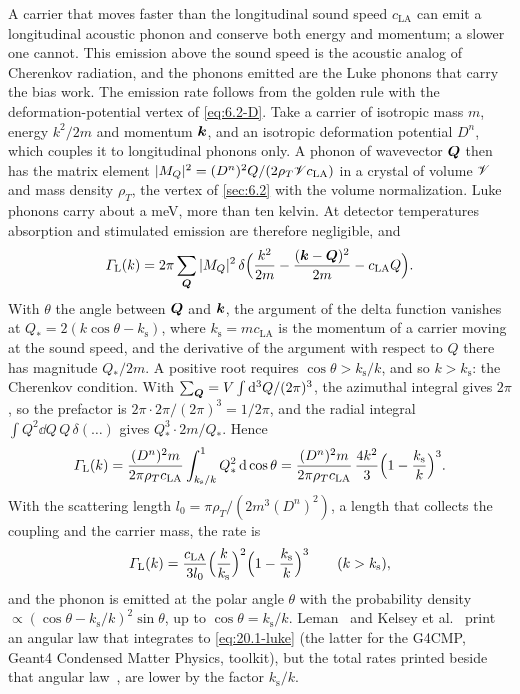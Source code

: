 A carrier that moves faster than the longitudinal sound speed $c_{\mathrm{LA}}$ can emit a longitudinal acoustic phonon and conserve both energy and momentum; a slower one cannot. This emission above the sound speed is the acoustic analog of Cherenkov radiation, and the phonons emitted are the Luke phonons that carry the bias work. The emission rate follows from the golden rule with the deformation-potential vertex of \cref{eq:6.2-D}. Take a carrier of isotropic mass $m$, energy $k^2/2m$ and momentum $\bm{k}$, and an isotropic deformation potential $D^n$, which couples it to longitudinal phonons only. A phonon of wavevector $\bm{Q}$ then has the matrix element $|M_Q|^2 = (D^n)^2Q/(2\rho_T\mathscr{V} c_{\mathrm{LA}})$ in a crystal of volume $\mathscr{V}$ and mass density $\rho_T$, the vertex of \cref{sec:6.2} with the volume normalization. Luke phonons carry about a meV, more than ten kelvin. At detector temperatures absorption and stimulated emission are therefore negligible, and
\begin{equation*}
  \varGamma_{\mathrm{L}}(k) = 2\pi\sum_{\bm{Q}}|M_Q|^2\,\delta\Bigl(\frac{k^2}{2m} - \frac{(\bm{k} - \bm{Q})^2}{2m} - c_{\mathrm{LA}}Q\Bigr) .
\end{equation*}
With $\theta$ the angle between $\bm{Q}$ and $\bm{k}$, the argument of the delta function vanishes at $Q_* = 2(k\cos\theta - k_{\mathrm{s}})$, where $k_{\mathrm{s}} = mc_{\mathrm{LA}}$ is the momentum of a carrier moving at the sound speed, and the derivative of the argument with respect to $Q$ there has magnitude $Q_*/2m$. A positive root requires $\cos\theta > k_{\mathrm{s}}/k$, and so $k > k_{\mathrm{s}}$: the Cherenkov condition. With $\sum_{\bm{Q}} = V\int\mathrm{d}^3Q/(2\pi)^3$, the azimuthal integral gives $2\pi$, so the prefactor is $2\pi\cdot2\pi/(2\pi)^3 = 1/2\pi$, and the radial integral $\int Q^2\dd Q\,Q\,\delta(\ldots)$ gives $Q_*^3\cdot2m/Q_*$. Hence
\begin{equation*}
  \varGamma_{\mathrm{L}}(k) = \frac{(D^n)^2m}{2\pi\rho_Tc_{\mathrm{LA}}}\int_{k_{\mathrm{s}}/k}^1 Q_*^2\,\mathrm{d}\cos\theta = \frac{(D^n)^2m}{2\pi\rho_Tc_{\mathrm{LA}}}\,\frac{4k^2}{3}\Bigl(1 - \frac{k_{\mathrm{s}}}{k}\Bigr)^3 .
\end{equation*}
With the scattering length $l_0 = \pi\rho_T/(2m^3(D^n)^2)$, a length that collects the coupling and the carrier mass, the rate is
\begin{equation}
  \varGamma_{\mathrm{L}}(k) = \frac{c_{\mathrm{LA}}}{3l_0}\Bigl(\frac{k}{k_{\mathrm{s}}}\Bigr)^2\Bigl(1 - \frac{k_{\mathrm{s}}}{k}\Bigr)^3 \qquad (k > k_{\mathrm{s}}),
  \label{eq:20.1-luke}
\end{equation}
and the phonon is emitted at the polar angle $\theta$ with the probability density $\propto(\cos\theta - k_{\mathrm{s}}/k)^2\sin\theta$, up to $\cos\theta = k_{\mathrm{s}}/k$. Leman~\cite[Eq.~(22)]{leman2012invited} and Kelsey et al.~\cite[Eq.~(9)]{kelsey2023g4cmp} print an angular law that integrates to \cref{eq:20.1-luke} (the latter for the G4CMP, Geant4 Condensed Matter Physics, toolkit), but the total rates printed beside that angular law~\cite[Eq.~(21)]{leman2012invited}, \cite[Eq.~(8)]{kelsey2023g4cmp} are lower by the factor $k_{\mathrm{s}}/k$.

